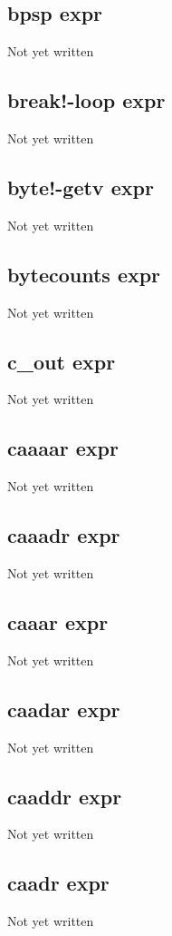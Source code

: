 \documentclass[a4paper,11pt]{article}
\begin{document}
\subsection{\ttfamily bpsp expr}
Not yet written

\subsection{\ttfamily break!-loop expr}
Not yet written

\subsection{\ttfamily byte!-getv expr}
Not yet written

\subsection{\ttfamily bytecounts expr}
Not yet written

\subsection{\ttfamily c\_out expr}
Not yet written

\subsection{\ttfamily caaaar expr}
Not yet written

\subsection{\ttfamily caaadr expr}
Not yet written

\subsection{\ttfamily caaar expr}
Not yet written

\subsection{\ttfamily caadar expr}
Not yet written

\subsection{\ttfamily caaddr expr}
Not yet written

\subsection{\ttfamily caadr expr}
Not yet written
\end{document}
